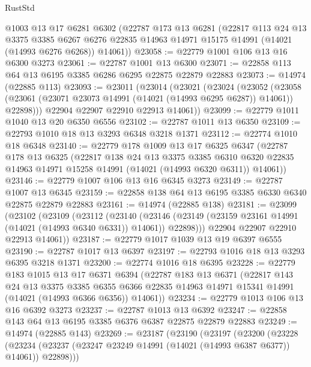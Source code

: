 \begin{lexlean}{RustStd}
\begin{coremodule}
    @1003
    @13
    @17
    @6281
    @6302
    (@22787
      @173
      @13
      @6281
      (@22817
        @113
        @24
        @13
        @3375
        @3385
        @6267
        @6276
        @22835
        @14963
        @14971
        @15175
        @14991
        (@14021 (@14993 @6276 @6268))
        @14061))
@23058 := @22779 @1001 @106 @13 @16 @6300 @3273
@23061 := @22787 @1001 @13 @6300
@23071 := @22858 @113 @64 @13 @6195 @3385 @6286 @6295 @22875 @22879 @22883
@23073 := @14974 (@22885 @113)
@23093 := @23011
    (@23014
      (@23021
        (@23024
          (@23052
            (@23058 (@23061 (@23071 @23073 @14991 (@14021 (@14993 @6295 @6287)) @14061)) @22898)))
        @22904
        @22907
        @22910
        @22913
        @14061))
@23099 := @22779 @1011 @1040 @13 @20 @6350 @6556
@23102 := @22787 @1011 @13 @6350
@23109 := @22793 @1010 @18 @13 @3293 @6348 @3218 @1371
@23112 := @22774 @1010 @18 @6348
@23140 := @22779
    @178
    @1009
    @13
    @17
    @6325
    @6347
    (@22787
      @178
      @13
      @6325
      (@22817
        @138
        @24
        @13
        @3375
        @3385
        @6310
        @6320
        @22835
        @14963
        @14971
        @15258
        @14991
        (@14021 (@14993 @6320 @6311))
        @14061))
@23146 := @22779 @1007 @106 @13 @16 @6345 @3273
@23149 := @22787 @1007 @13 @6345
@23159 := @22858 @138 @64 @13 @6195 @3385 @6330 @6340 @22875 @22879 @22883
@23161 := @14974 (@22885 @138)
@23181 := @23099
    (@23102
      (@23109
        (@23112
          (@23140
            (@23146 (@23149 (@23159 @23161 @14991 (@14021 (@14993 @6340 @6331)) @14061)) @22898)))
        @22904
        @22907
        @22910
        @22913
        @14061))
@23187 := @22779 @1017 @1039 @13 @19 @6397 @6555
@23190 := @22787 @1017 @13 @6397
@23197 := @22793 @1016 @18 @13 @3293 @6395 @3218 @1371
@23200 := @22774 @1016 @18 @6395
@23228 := @22779
    @183
    @1015
    @13
    @17
    @6371
    @6394
    (@22787
      @183
      @13
      @6371
      (@22817
        @143
        @24
        @13
        @3375
        @3385
        @6355
        @6366
        @22835
        @14963
        @14971
        @15341
        @14991
        (@14021 (@14993 @6366 @6356))
        @14061))
@23234 := @22779 @1013 @106 @13 @16 @6392 @3273
@23237 := @22787 @1013 @13 @6392
@23247 := @22858 @143 @64 @13 @6195 @3385 @6376 @6387 @22875 @22879 @22883
@23249 := @14974 (@22885 @143)
@23269 := @23187
    (@23190
      (@23197
        (@23200
          (@23228
            (@23234 (@23237 (@23247 @23249 @14991 (@14021 (@14993 @6387 @6377)) @14061)) @22898)))

\end{coremodule}
\end{lexlean}

